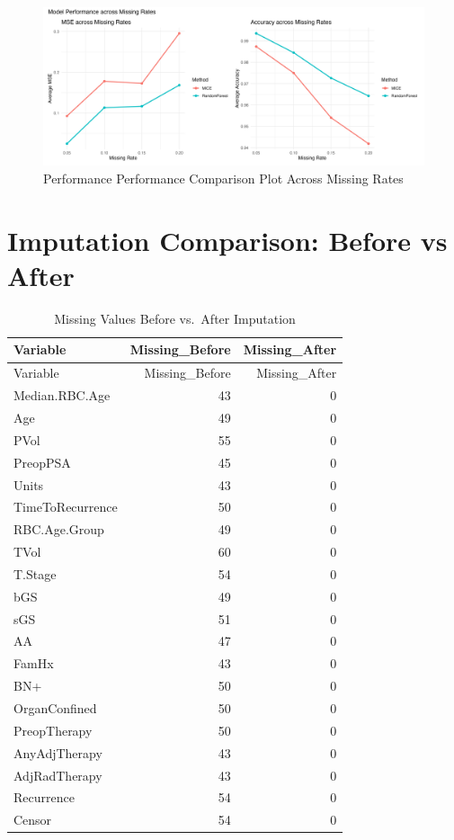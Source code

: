 \documentclass[
]{article}
\begin{document}
\begin{figure}[H]

{\centering \includegraphics[width=0.9\linewidth]{../example/lineplot_MSE_Accuracy_combined} 

}

\caption{Performance Performance Comparison Plot Across Missing Rates}\label{fig:show-performance-lineplot}
\end{figure}

\section{Imputation Comparison: Before vs
After}\label{imputation-comparison-before-vs-after}

\begin{longtable}[]{@{}lrr@{}}
\caption{Missing Values Before vs.~After Imputation}\tabularnewline
\toprule\noalign{}
Variable & Missing\_Before & Missing\_After \\
\midrule\noalign{}
\endfirsthead
\toprule\noalign{}
Variable & Missing\_Before & Missing\_After \\
\midrule\noalign{}
\endhead
\bottomrule\noalign{}
\endlastfoot
Median.RBC.Age & 43 & 0 \\
Age & 49 & 0 \\
PVol & 55 & 0 \\
PreopPSA & 45 & 0 \\
Units & 43 & 0 \\
TimeToRecurrence & 50 & 0 \\
RBC.Age.Group & 49 & 0 \\
TVol & 60 & 0 \\
T.Stage & 54 & 0 \\
bGS & 49 & 0 \\
sGS & 51 & 0 \\
AA & 47 & 0 \\
FamHx & 43 & 0 \\
BN+ & 50 & 0 \\
OrganConfined & 50 & 0 \\
PreopTherapy & 50 & 0 \\
AnyAdjTherapy & 43 & 0 \\
AdjRadTherapy & 43 & 0 \\
Recurrence & 54 & 0 \\
Censor & 54 & 0 \\
\end{longtable}
\end{document}
